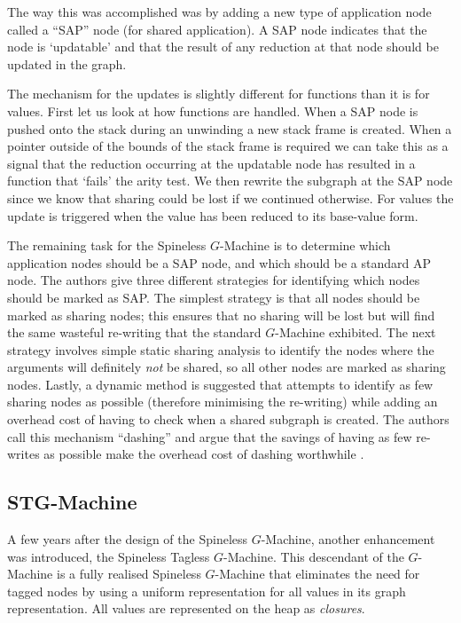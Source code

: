     The way this was accomplished was by adding a new type of application node
called a ``SAP'' node (for shared application). A SAP node indicates
that the node is `updatable' and that the result of any reduction at that node
should be updated in the graph.

    The mechanism for the updates is slightly different for functions than it is
for values. First let us look at how functions are handled. When a SAP node is
pushed onto the stack during an unwinding a new stack frame is created. When a
pointer outside of the bounds of the stack frame is required we can take this as
a signal that the reduction occurring at the updatable node has resulted in a
function that `fails' the arity test. We then rewrite the subgraph at the SAP
node since we know that sharing could be lost if we continued otherwise.
For values the update is triggered when the value has been reduced to its
base-value form.

    The remaining task for the Spineless $G$-Machine is to determine which
application nodes should be a SAP node, and which should be a standard AP node.
The authors give three different strategies for identifying which nodes should
be marked as SAP. The simplest strategy is that all nodes should be marked as
sharing nodes; this ensures that no sharing will be lost but will find the same
wasteful re-writing that the standard $G$-Machine exhibited. The next strategy
involves simple static sharing analysis to identify the nodes where the
arguments will definitely \emph{not} be shared, so all other nodes are marked as
sharing nodes. Lastly, a dynamic method is suggested that attempts to identify
as few sharing nodes as possible (therefore minimising the re-writing) while
adding an overhead cost of having to check when a shared subgraph is created.
The authors call this mechanism ``dashing'' and argue that the savings of having
as few re-writes as possible make the overhead cost of dashing worthwhile
\citep{burn1988spineless}.


 \subsection{STG-Machine}

A few years after the design of the Spineless $G$-Machine, another enhancement
was introduced, the Spineless Tagless $G$-Machine. This descendant of the
$G$-Machine is a fully realised Spineless $G$-Machine that eliminates the need
for tagged nodes by using a uniform representation for all values in its graph
representation. All values are represented on the heap as \emph{closures}.

